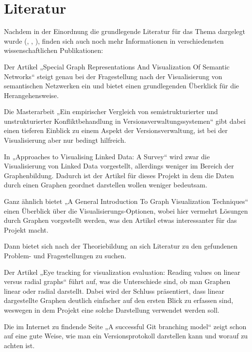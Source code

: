 \documentclass[color, ddc]{tudscrreprt}
\begin{document}
\section{Literatur}

Nachdem in der Einordnung die grundlegende Literatur für das Thema dargelegt wurde (\cite{pascal:semanic-web}, \cite{graube:r43ples}, \cite{url:git}), finden sich auch noch mehr Informationen in verschiedensten wissenschaftlichen Publikationen:

Der Artikel „Special Graph Representations And Visualization Of Semantic Networks“ \cite{borisenko:graph-representation} steigt genau bei der Fragestellung nach der Visualisierung von semantischen Netzwerken ein und bietet einen grundlegenden Überklick für die Herangehensweise.

Die Masterarbeit „Ein empirischer Vergleich von semistrukturierter und unstrukturierter Konfliktbehandlung in Versionsverwaltungssystemen“ \cite{brandl:versionsverwaltung} gibt dabei einen tieferen Einblick zu einem Aspekt der Versionsverwaltung, ist bei der Visualisierung aber nur bedingt hilfreich.

In „Approaches to Visualising Linked Data: A Survey“ \cite{dadzie:linked-data} wird zwar die Visualisierung von Linked Data vorgestellt, allerdings weniger im Bereich der Graphenbildung. Dadurch ist der Artikel für dieses Projekt in dem die Daten durch einen Graphen geordnet darstellen wollen weniger bedeutsam.

Ganz ähnlich bietet „A General Introduction To Graph Visualization Techniques“ \cite{tarawneh:graph-visualization} einen Überblick über die Visualisierungs-Optionen, wobei hier vermehrt Lösungen durch Graphen vorgestellt werden, was den Artikel etwas interessanter für das Projekt macht.

Dann bietet sich nach der Theoriebildung an sich Literatur zu den gefundenen Problem- und Fragestellungen zu suchen.

Der Artikel „Eye tracking for visualization evaluation: Reading values on linear versus radial graphs“ \cite{goldberg:visualization-evaluation} führt auf, was die Unterschiede sind, ob man Graphen linear oder radial darstellt. Dabei wird der Schluss präsentiert, dass linear dargestellte Graphen deutlich einfacher auf den ersten Blick zu erfassen sind, weswegen in dem Projekt eine solche Darstellung verwendet werden soll.

Die im Internet zu findende Seite „A successful Git branching model“ \cite{driessen:branching-model} zeigt schon auf eine gute Weise, wie man ein Versionsprotokoll darstellen kann und worauf zu achten ist.
\end{document}
